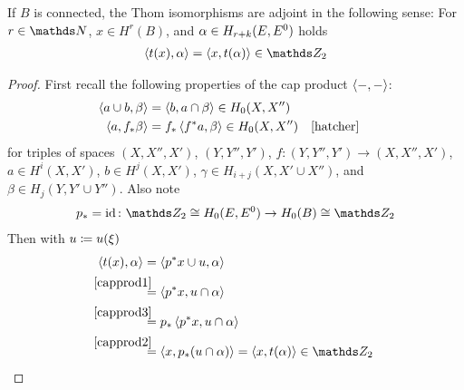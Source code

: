 \begin{Lem}\label{thomisoself-adjoint}
  If $B$ is connected, the Thom isomorphisms are adjoint in the
  following sense:
  For $r\in\Nat$, $x\in H^r(B)$,
  and $\alpha\in H_{r+k}(E, {E}^0)$  holds 
  \begin{gather*}
    \capped{t(x)}{\alpha} = \capped{x}{t(\alpha)} \in\Zmod2
  \end{gather*}
  \begin{proof}
    First recall the following properties of the cap product
    $\left\langle -, - \right\rangle$:
    \begin{align}
      \label{capprod1}
      \capped{a\cup b}{\beta} &= \capped{b}{a\cap\beta}
                                \in H_0(X,X'')\\
      \label{capprod2}
      \capped{a}{\pf f \beta} &= \pf f \capped{\pb f a}{\beta}
                                \in H_0(X,X'')
                                &&\text{\cite[Chap.~3.3.2, p.\,241]{hatcher}}
    \end{align}
    for
    triples of spaces $(X, X'', X')$, $(Y, Y'', Y')$,
    $f\colon (Y,Y'',Y')\to (X,X'',X')$,
    $a\in H^i(X,X')$, $b\in H^j(X,X')$,
    $\gamma\in H_{i+j}(X, X'\cup X'')$,
    and
    $\beta\in H_j(Y, Y'\cup Y'')$.
    Also note
    \begin{gather}
      \label{capprod3}
      \pf p = \Id \colon
      \Zmod2\cong H_0(\thomspacepair{E})\to H_0(B)\cong\Zmod2
    \end{gather}
    Then with $u\coloneqq u(\xi)$
    \begin{align*}
      \capped{t(x)}{\alpha}
      &= \capped{\pb p x \cup \u}{\alpha} \\
      &\overset{\mathllap{\eqref{capprod1}}}=
        \capped{\pb p x}{\u\cap\alpha} \\
      &\overset{\mathllap{\eqref{capprod3}}}=
        \pf p\capped{\pb p x}{\u\cap\alpha} \\
      &\overset{\mathllap{\eqref{capprod2}}}=
        \capped{x}{\pf p(u\cap\alpha)}
        = \capped{x}{\thomiso (\alpha)} \in\Zmod2
    \end{align*}
  \end{proof}
\end{Lem}

